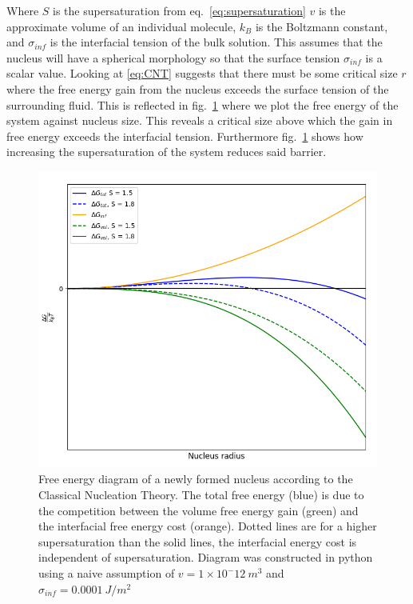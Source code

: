 Where $S$ is the supersaturation from eq.~\eqref{eq:supersaturation} 
$v$ is the approximate volume of an individual molecule, 
$k_B$ is the Boltzmann constant, and $\sigma_{inf}$ is the 
interfacial tension of the bulk solution. This assumes that 
the nucleus will have a spherical morphology so that the 
surface tension $\sigma_{inf}$ is a scalar value. Looking at 
\eqref{eq:CNT} suggests that there must be some critical size 
$r$ where the free energy gain from the nucleus exceeds the 
surface tension of the surrounding fluid. This is reflected in 
fig.~\ref{fig:free_energy} where we plot the free energy of the 
system against nucleus size. This reveals a critical size above 
which the gain in free energy exceeds the interfacial tension. 
Furthermore fig.~\ref{fig:free_energy} shows how increasing the 
supersaturation of the system reduces said barrier. 
\begin{figure}[h!]
	\centering
	\includegraphics[width=\linewidth]{Free_Energy_Diagram.png}
	\caption{Free energy diagram of a newly formed nucleus according 
		to the Classical Nucleation Theory. The total free energy (blue)
		is due to the competition between the volume free energy gain
		(green) and the interfacial free energy cost (orange). Dotted
		lines are for a higher supersaturation than the solid lines,
		the interfacial energy cost is independent of supersaturation.
		Diagram was constructed in python using a naive assumption 
		of $v=1\times 10^-12\ m^3$ and $\sigma_{inf}=0.0001\ J/m^2$}
	\label{fig:free_energy}
\end{figure}

